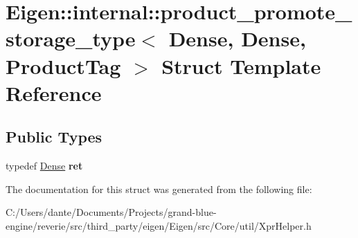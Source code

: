 \hypertarget{struct_eigen_1_1internal_1_1product__promote__storage__type_3_01_dense_00_01_dense_00_01_product_tag_01_4}{}\section{Eigen\+::internal\+::product\+\_\+promote\+\_\+storage\+\_\+type$<$ Dense, Dense, Product\+Tag $>$ Struct Template Reference}
\label{struct_eigen_1_1internal_1_1product__promote__storage__type_3_01_dense_00_01_dense_00_01_product_tag_01_4}
\subsection*{Public Types}
\begin{DoxyCompactItemize}
\item 
\mbox{\label{struct_eigen_1_1internal_1_1product__promote__storage__type_3_01_dense_00_01_dense_00_01_product_tag_01_4_a906505ffb186319872f7c08d884b2885}} 
typedef \mbox{\hyperlink{struct_eigen_1_1_dense}{Dense}} {\bfseries ret}
\end{DoxyCompactItemize}


The documentation for this struct was generated from the following file\+:\begin{DoxyCompactItemize}
\item 
C\+:/\+Users/dante/\+Documents/\+Projects/grand-\/blue-\/engine/reverie/src/third\+\_\+party/eigen/\+Eigen/src/\+Core/util/Xpr\+Helper.\+h\end{DoxyCompactItemize}
